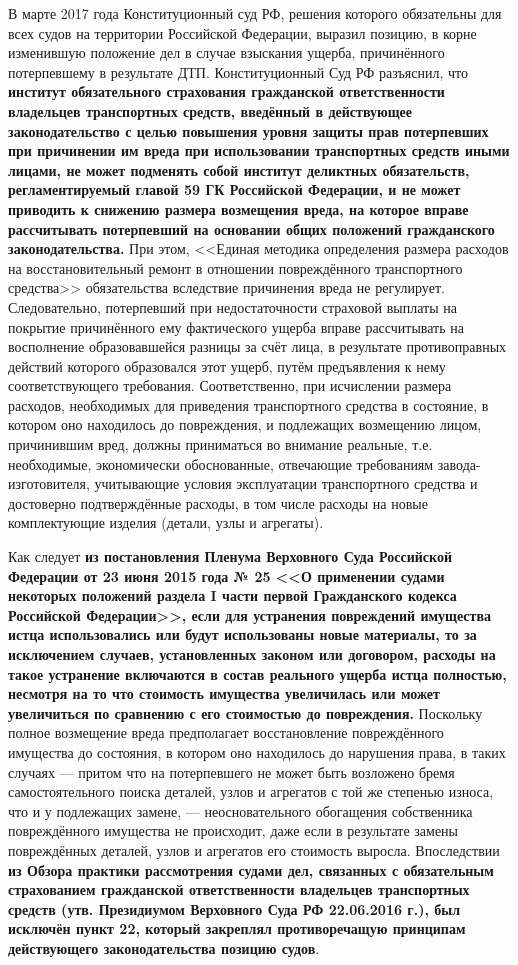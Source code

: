 В марте 2017 года Конституционный суд РФ, решения которого обязательны для всех судов на территории Российской Федерации, выразил позицию, в корне изменившую положение дел в случае взыскания ущерба, причинённого потерпевшему в результате ДТП. 
Конституционный Суд РФ разъяснил, что \textbf{институт обязательного страхования гражданской ответственности владельцев транспортных средств, введённый в действующее законодательство с целью повышения уровня защиты прав потерпевших при причинении им вреда при использовании транспортных средств иными лицами, не может подменять собой институт деликтных обязательств, регламентируемый главой 59 ГК Российской Федерации, и не может приводить к снижению размера возмещения вреда, на которое вправе рассчитывать потерпевший на основании общих положений гражданского законодательства. }
При этом, <<Единая методика определения размера расходов на восстановительный ремонт в отношении повреждённого транспортного средства>> обязательства вследствие причинения вреда не регулирует. 
Следовательно, потерпевший при недостаточности страховой выплаты на покрытие причинённого ему фактического ущерба вправе рассчитывать на восполнение образовавшейся разницы за счёт лица, в результате противоправных действий которого образовался этот ущерб, путём предъявления к нему соответствующего требования. 
Соответственно, при исчислении размера расходов, необходимых для приведения транспортного средства в состояние, в котором оно находилось до повреждения, и подлежащих возмещению лицом, причинившим вред, должны приниматься во внимание реальные, т.е. необходимые, экономически обоснованные, отвечающие требованиям завода-изготовителя, учитывающие условия эксплуатации транспортного средства и достоверно подтверждённые расходы, в том числе расходы на новые комплектующие изделия (детали, узлы и агрегаты).

Как следует \textbf{из постановления Пленума Верховного Суда Российской Федерации от 23 июня 2015 года № 25 <<О применении судами некоторых положений раздела I части первой Гражданского кодекса Российской Федерации>>, если для устранения повреждений имущества истца использовались или будут использованы новые материалы, то за исключением случаев, установленных законом или договором, расходы на такое устранение включаются в состав реального ущерба истца полностью, несмотря на то что стоимость имущества увеличилась или может увеличиться по сравнению с его стоимостью до повреждения.} 
Поскольку полное возмещение вреда предполагает восстановление повреждённого имущества до состояния, в котором оно находилось до нарушения права, в таких случаях — притом что на потерпевшего не может быть возложено бремя самостоятельного поиска деталей, узлов и агрегатов с той же степенью износа, что и у подлежащих замене, — неосновательного обогащения собственника повреждённого имущества не происходит, даже если в результате замены повреждённых деталей, узлов и агрегатов его стоимость выросла.
Впоследствии \textbf{из Обзора практики рассмотрения судами дел, связанных с обязательным страхованием гражданской ответственности владельцев транспортных средств (утв. Президиумом Верховного Суда РФ 22.06.2016 г.), был исключён пункт 22, который закреплял противоречащую принципам действующего законодательства позицию судов}.



